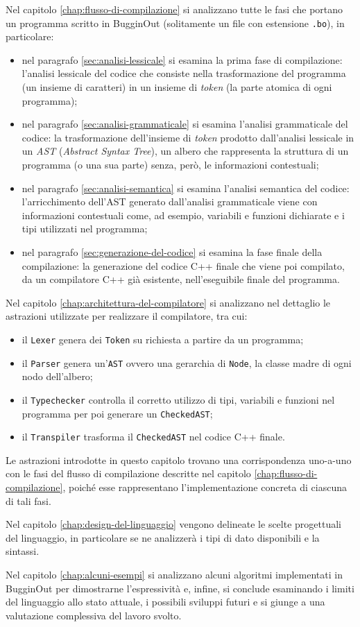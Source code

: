 Nel capitolo \ref{chap:flusso-di-compilazione} si analizzano tutte le fasi che portano un programma scritto in BugginOut (solitamente un file con estensione \texttt{.bo}), in particolare:
\begin{itemize}
	\item nel paragrafo \ref{sec:analisi-lessicale} si esamina la prima fase di compilazione: l'analisi lessicale del codice che consiste nella trasformazione del programma (un insieme di caratteri) in un insieme di \emph{token} (la parte atomica di ogni programma);
	\item nel paragrafo \ref{sec:analisi-grammaticale} si esamina l'analisi grammaticale del codice: la trasformazione dell'insieme di \emph{token} prodotto dall'analisi lessicale in un \emph{AST} (\textit{Abstract Syntax Tree}), un albero che rappresenta la struttura di un programma (o una sua parte) senza, per\`o, le informazioni contestuali;
	\item nel paragrafo \ref{sec:analisi-semantica} si esamina l'analisi semantica del codice: l'arricchimento dell'AST generato dall'analisi grammaticale viene con informazioni contestuali come, ad esempio, variabili e funzioni dichiarate e i tipi utilizzati nel programma;
	\item nel paragrafo \ref{sec:generazione-del-codice} si esamina la fase finale della compilazione: la generazione del codice C++ finale che viene poi compilato, da un compilatore C++ gi\`a esistente, nell'eseguibile finale del programma.
\end{itemize}
Nel capitolo \ref{chap:architettura-del-compilatore} si analizzano nel dettaglio le astrazioni utilizzate per realizzare il compilatore, tra cui:
\begin{itemize}
	\item il \texttt{Lexer} genera dei \texttt{Token} su richiesta a partire da un programma;
	\item il \texttt{Parser} genera un'\texttt{AST} ovvero una gerarchia di \texttt{Node}, la classe madre di ogni nodo dell'albero;
	\item il \texttt{Typechecker} controlla il corretto utilizzo di tipi, variabili e funzioni nel programma per poi generare un \texttt{CheckedAST};
	\item il \texttt{Transpiler} trasforma il \texttt{CheckedAST} nel codice C++ finale.
\end{itemize}
Le astrazioni introdotte in questo capitolo trovano una corrispondenza uno-a-uno con le fasi del flusso di compilazione descritte nel capitolo \ref{chap:flusso-di-compilazione}, poiché esse rappresentano l’implementazione concreta di ciascuna di tali fasi.

Nel capitolo \ref{chap:design-del-linguaggio} vengono delineate le scelte progettuali del linguaggio, in particolare se ne analizzer\`a i tipi di dato disponibili e la sintassi.

Nel capitolo \ref{chap:alcuni-esempi} si analizzano alcuni algoritmi implementati in BugginOut per dimostrarne l'espressivit\`a e, infine, si conclude esaminando i limiti del linguaggio allo stato attuale, i possibili sviluppi futuri e si giunge a una valutazione complessiva del lavoro svolto.

